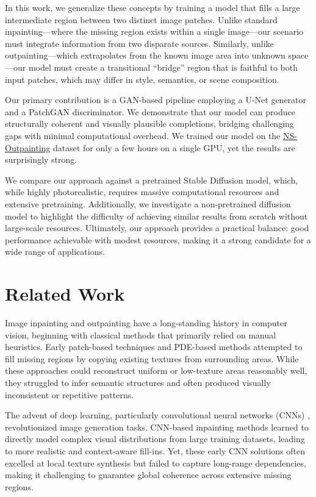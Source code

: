\documentclass[sigconf]{acmart}
\begin{document}
In this work, we generalize these concepts by training a model that fills a large intermediate region between two distinct image patches. Unlike standard inpainting—where the missing region exists within a single image—our scenario must integrate information from two disparate sources. Similarly, unlike outpainting—which extrapolates from the known image area into unknown space—our model must create a transitional “bridge” region that is faithful to both input patches, which may differ in style, semantics, or scene composition.

Our primary contribution is a GAN-based pipeline employing a U-Net generator and a PatchGAN discriminator. We demonstrate that our model can produce structurally coherent and visually plausible completions, bridging challenging gaps with minimal computational overhead. We trained our model on the \textcolor{red}{\href{https://github.com/z-x-yang/NS-Outpainting}{NS-Outpainting}} dataset for only a few hours on a single GPU, yet the results are surprisingly strong.

We compare our approach against a pretrained Stable Diffusion model, which, while highly photorealistic, requires massive computational resources and extensive pretraining. Additionally, we investigate a non-pretrained diffusion model to highlight the difficulty of achieving similar results from scratch without large-scale resources. Ultimately, our approach provides a practical balance: good performance achievable with modest resources, making it a strong candidate for a wide range of applications.

\section{Related Work}

Image inpainting and outpainting have a long-standing history in computer vision, beginning with classical methods that primarily relied on manual heuristics. Early patch-based techniques and PDE-based methods attempted to fill missing regions by copying existing textures from surrounding areas. While these approaches could reconstruct uniform or low-texture areas reasonably well, they struggled to infer semantic structures and often produced visually inconsistent or repetitive patterns.

The advent of deep learning, particularly convolutional neural networks (CNNs) \cite{Krizhevsky2012,LeCun1998}, revolutionized image generation tasks. CNN-based inpainting methods learned to directly model complex visual distributions from large training datasets, leading to more realistic and context-aware fill-ins. Yet, these early CNN solutions often excelled at local texture synthesis but failed to capture long-range dependencies, making it challenging to guarantee global coherence across extensive missing regions.
\end{document}
